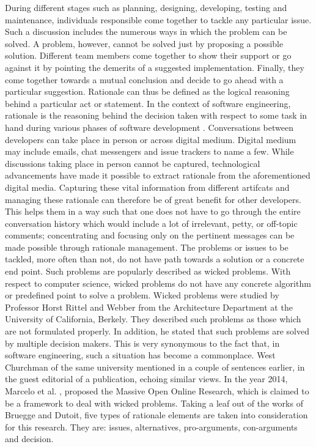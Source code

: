 \documentclass[a4paper,12pt,twoside]{report}
\begin{document}
During different stages such as planning, designing, developing, testing and maintenance, individuals responsible come together to tackle any particular issue. Such a discussion includes the numerous ways in which the problem can be solved. A problem, however, cannot be solved just by proposing a possible solution. Different team members come together to show their support or go against it by pointing the demerits of a suggested implementation. Finally, they come together towards a mutual conclusion and decide to go ahead with a particular suggestion. Rationale can thus be defined as the logical reasoning behind a particular act or statement. In the context of software engineering, rationale is the reasoning behind the decision taken with respect to some task in hand during various phases of software development \cite{Dutoit2006} \cite{Bruegge2009}. 
\bigbreak
Conversations between developers can take place in person or across digital medium. Digital medium may include emails, chat messengers and issue trackers to name a few. While discussions taking place in person cannot be captured, technological advancements have made it possible to extract rationale from the aforementioned digital media. Capturing these vital information from different artifcats and managing these rationale can therefore be of great benefit for other developers. This helps them in a way such that one does not have to go through the entire conversation history which would include a lot of irrelevant, petty, or off-topic comments; concentrating and focusing only on the pertinent messages can be made possible through rationale management. 
\bigbreak
The problems or issues to be tackled, more often than not, do not have path towards a solution or a concrete end point. Such problems are popularly described as wicked problems. With respect to computer science, wicked problems do not have any concrete algorithm or predefined point to solve a problem. Wicked problems were studied by Professor Horst Rittel and Webber \cite{Rittel1973} from the Architecture Department at the University of California, Berkely. They described such problems as those which are not formulated properly. In addition, he stated that such problems are solved by multiple decision makers. This is very synonymous to the fact that, in software engineering, such a situation has become a commonplace. West Churchman \cite{InstituteofManagementSciences.1967} of the same university mentioned in a couple of sentences earlier, in the guest editorial of a publication, echoing similar views. In the year 2014, Marcelo et al. \cite{Machado2014}, proposed the Massive Open Online Research, which is claimed to be a framework to deal with wicked problems. 
\bigbreak
Taking a leaf out of the works of Bruegge and Dutoit\cite{Bruegge2009}, five types of rationale elements are taken into consideration for this research. They are: issues, alternatives, pro-arguments, con-arguments and decision.
 
\end{document}
